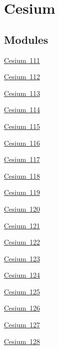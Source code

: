 \hypertarget{group___isotope_const-_cesium}{}\section{Cesium}
\label{group___isotope_const-_cesium}
\subsection*{Modules}
\begin{DoxyCompactItemize}
\item 
\mbox{\hyperlink{group___isotope_const-_cesium-_cs111}{Cesium 111}}
\item 
\mbox{\hyperlink{group___isotope_const-_cesium-_cs112}{Cesium 112}}
\item 
\mbox{\hyperlink{group___isotope_const-_cesium-_cs113}{Cesium 113}}
\item 
\mbox{\hyperlink{group___isotope_const-_cesium-_cs114}{Cesium 114}}
\item 
\mbox{\hyperlink{group___isotope_const-_cesium-_cs115}{Cesium 115}}
\item 
\mbox{\hyperlink{group___isotope_const-_cesium-_cs116}{Cesium 116}}
\item 
\mbox{\hyperlink{group___isotope_const-_cesium-_cs117}{Cesium 117}}
\item 
\mbox{\hyperlink{group___isotope_const-_cesium-_cs118}{Cesium 118}}
\item 
\mbox{\hyperlink{group___isotope_const-_cesium-_cs119}{Cesium 119}}
\item 
\mbox{\hyperlink{group___isotope_const-_cesium-_cs120}{Cesium 120}}
\item 
\mbox{\hyperlink{group___isotope_const-_cesium-_cs121}{Cesium 121}}
\item 
\mbox{\hyperlink{group___isotope_const-_cesium-_cs122}{Cesium 122}}
\item 
\mbox{\hyperlink{group___isotope_const-_cesium-_cs123}{Cesium 123}}
\item 
\mbox{\hyperlink{group___isotope_const-_cesium-_cs124}{Cesium 124}}
\item 
\mbox{\hyperlink{group___isotope_const-_cesium-_cs125}{Cesium 125}}
\item 
\mbox{\hyperlink{group___isotope_const-_cesium-_cs126}{Cesium 126}}
\item 
\mbox{\hyperlink{group___isotope_const-_cesium-_cs127}{Cesium 127}}
\item 
\mbox{\hyperlink{group___isotope_const-_cesium-_cs128}{Cesium 128}}

\end{DoxyCompactItemize}
